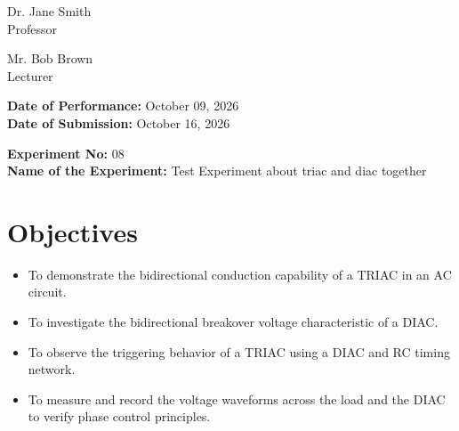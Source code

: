 \documentclass[12pt,a4paper]{article}
\begin{document}
\begin{titlepage}
\begin{minipage}[t]{0.5\textwidth}
\begin{flushright}
            Dr. Jane Smith \\
            Professor \\
            \vspace{0.3cm}
            
            Mr. Bob Brown \\
            Lecturer \\
            
            
        \end{flushright}
    \end{minipage}

    \vfill
    \textbf{Date of Performance:} October 09, 2026 \\
    \textbf{Date of Submission:} October 16, 2026
    
\end{titlepage}

\setcounter{page}{1}
\rmfamily %
\normalsize

\begin{center}
    \textbf{Experiment No:} 08 \\
    \vspace{0.2cm}
    \textbf{Name of the Experiment:} Test Experiment about triac and diac together
\end{center}
\vspace{0.5cm}


\section{Objectives}
\begin{itemize}

    \item To demonstrate the bidirectional conduction capability of a TRIAC in an AC circuit.

    \item To investigate the bidirectional breakover voltage characteristic of a DIAC.

    \item To observe the triggering behavior of a TRIAC using a DIAC and RC timing network.

    \item To measure and record the voltage waveforms across the load and the DIAC to verify phase control principles.

\end{itemize}
\end{document}
